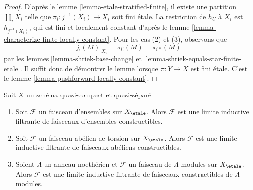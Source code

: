 \begin{proof}
D'apr\`es le lemme \ref{lemma-etale-stratified-finite}, il existe une partition
$\coprod_i X_i$ telle que $\pi_i : j^{-1}(X_i) \to X_i$ soit fini \'etale.
La restriction de $h_U$ \`a $X_i$ est $h_{j^{-1}(X_i)}$, qui est fini et
localement constant d'apr\`es le lemme \ref{lemma-characterize-finite-locally-constant}.
Pour les cas (2) et (3), observons que
$$
j_!(\underline{M})|_{X_i} =
\pi_{i!}(\underline{M}) =
\pi_{i*}(\underline{M})
$$
par les lemmes \ref{lemma-shriek-base-change} et
\ref{lemma-shriek-equals-star-finite-etale}.
Il suffit donc de d\'emontrer le lemme lorsque $\pi : Y \to X$ est fini \'etale.
C'est le lemme \ref{lemma-pushforward-locally-constant}.
\end{proof}

\begin{lemma}
\label{lemma-torsion-colimit-constructible}
Soit $X$ un sch\'ema quasi-compact et quasi-s\'epar\'e.
\begin{enumerate}
\item Soit $\mathcal{F}$ un faisceau d'ensembles sur $X_\etale$.
Alors $\mathcal{F}$ est une limite inductive filtrante de
faisceaux d'ensembles constructibles.
\item Soit $\mathcal{F}$ un faisceau ab\'elien de torsion sur $X_\etale$.
Alors $\mathcal{F}$ est une limite inductive filtrante de faisceaux ab\'eliens constructibles.
\item Soient $\Lambda$ un anneau noeth\'erien et $\mathcal{F}$ un faisceau
de $\Lambda$-modules sur $X_\etale$. Alors
$\mathcal{F}$ est une limite inductive filtrante de faisceaux constructibles de
$\Lambda$-modules.
\end{enumerate}
\end{lemma}

